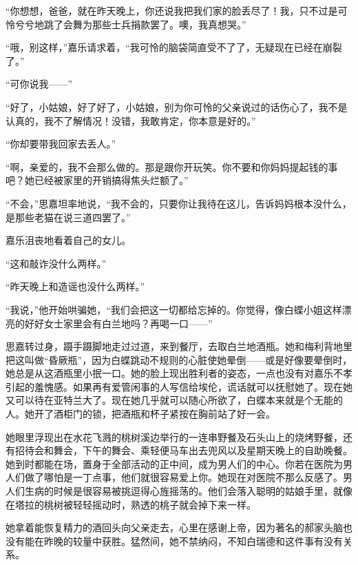 \par “你想想，爸爸，就在昨天晚上，你还说我把我们家的脸丢尽了！我，只不过是可怜兮兮地跳了会舞为那些士兵捐款罢了。噢，我真想哭。”
\par “哦，别这样，”嘉乐请求着，“我可怜的脑袋简直受不了了，无疑现在已经在崩裂了。”
\par “可你说我——”
\par “好了，小姑娘，好了好了，小姑娘，别为你可怜的父亲说过的话伤心了，我不是认真的，我不了解情况！没错，我敢肯定，你本意是好的。”
\par “你却要带我回家去丢人。”
\par “啊，亲爱的，我不会那么做的。那是跟你开玩笑。你不要和你妈妈提起钱的事吧？她已经被家里的开销搞得焦头烂额了。”
\par “不会，”思嘉坦率地说，“我不会的，只要你让我待在这儿，告诉妈妈根本没什么，是那些老猫在说三道四罢了。”
\par 嘉乐沮丧地看着自己的女儿。
\par “这和敲诈没什么两样。”
\par “昨天晚上和造谣也没什么两样。”
\par “我说，”他开始哄骗她，“我们会把这一切都给忘掉的。你觉得，像白蝶小姐这样漂亮的好好女士家里会有白兰地吗？再喝一口——”
\par 思嘉转过身，蹑手蹑脚地走过过道，来到餐厅，去取白兰地酒瓶。她和梅利背地里把这叫做“昏厥瓶”，因为白蝶跳动不规则的心脏使她晕倒——或是好像要晕倒时，她总是从这酒瓶里小抿一口。她的脸上现出胜利者的姿态，一点也没有对嘉乐不孝引起的羞愧感。如果再有爱管闲事的人写信给埃伦，谎话就可以抚慰她了。现在她又可以待在亚特兰大了。现在她几乎就可以随心所欲了，白蝶本来就是个无能的人。她开了酒柜门的锁，把酒瓶和杯子紧按在胸前站了好一会。
\par 她眼里浮现出在水花飞溅的桃树溪边举行的一连串野餐及石头山上的烧烤野餐，还有招待会和舞会，下午的舞会、乘轻便马车出去兜风以及星期天晚上的自助晚餐。她到时都能在场，置身于全部活动的正中间，成为男人们的中心。你若在医院为男人们做了哪怕是一丁点事，他们就很容易爱上你。她现在对医院不那么反感了。男人们生病的时候是很容易被挑逗得心旌摇荡的。他们会落入聪明的姑娘手里，就像在塔拉的桃树被轻轻摇动时，熟透的桃子就会掉下来一样。
\par 她拿着能恢复精力的酒回头向父亲走去，心里在感谢上帝，因为著名的郝家头脑也没有能在昨晚的较量中获胜。猛然间，她不禁纳闷，不知白瑞德和这件事有没有关系。












